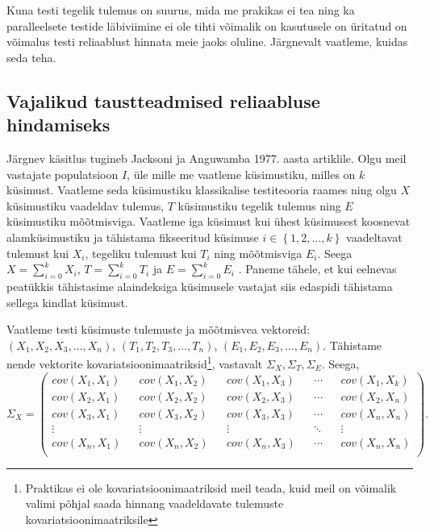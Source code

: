 \documentclass[a4paper,12pt,oneside]{article}
\numberwithin{equation}{section}
\theoremstyle{definition}
\begin{document}
Kuna testi tegelik tulemus on suurus, mida me prakikas ei tea ning ka paralleelsete testide läbiviimine ei ole tihti võimalik on kasutusele on üritatud on võimalus testi reliaablust hinnata meie jaoks oluline. Järgnevalt vaatleme, kuidas seda teha.



\subsection{Vajalikud taustteadmised reliaabluse hindamiseks}

Järgnev käsitlus tugineb Jacksoni ja Anguwamba 1977. aasta artiklile.\cite{Jackson1977}
Olgu meil vastajate populatsioon $I$, üle mille me vaatleme küsimustiku, milles on $k$ k\"usimust. Vaatleme seda küsimustiku klassikalise testiteooria raames ning olgu $X$ küsimustiku vaadeldav tulemus, $T$ küsimustiku tegelik tulemus ning $E$ küsimustiku mõõtmisviga. Vaatleme iga küsimust kui ühest küsimusest koosnevat alamküsimustiku ja tähistama fikseeritud k\"usimuse $ i \in \left\lbrace 1,2,\ldots,k \right\rbrace$ vaadeltavat tulemust kui $X_i$, tegeliku tulemust kui $T_i$ ning mõõtmisviga $E_i$. Seega $X = \sum \limits_{i=0}^{k} X_i$, $T = \sum \limits_{i=0}^{k} T_i$ ja $E = \sum \limits_{i=0}^{k} E_i$ . Paneme tähele, et kui eelnevas peatükkis tähistasime alaindeksiga küsimusele vastajat siis edaspidi tähistama sellega kindlat küsimust. 

Vaatleme testi k\"usimuste tulemuste ja mõõtmisvea vektoreid: $\left( X_1, X_2, X_3, \ldots, X_n \right)$, $\left( T_1, T_2, T_3, \ldots, T_n \right)$, $\left( E_1, E_2, E_3, \ldots, E_n \right)$. Tähistame nende vektorite kovariatsioonimaatriksid\footnote{Praktikas ei ole kovariatsioonimaatriksid meil teada, kuid meil on võimalik valimi põhjal saada hinnang vaadeldavate tulemuste kovariatsioonimaatriksile }, vastavalt $\Sigma_X, \Sigma_T, \Sigma_E$. Seega, 
\small
\begin{equation*}
\Sigma_X = 
\begin{pmatrix}
cov \left(X_1,X_1 \right) && cov\left( X_1,X_2 \right) && cov \left( X_1,X_3 \right) && \cdots && cov \left( X_1,X_k \right) \\
cov \left(X_2, X_1 \right) && cov \left(X_2, X_2 \right) && cov \left(X_2, X_3 \right) && \cdots && cov \left(X_2, X_n \right) \\
cov \left(X_3, X_1 \right) && cov \left(X_3, X_2 \right) && cov \left(X_3, X_3 \right) && \cdots && cov \left(X_n, X_n \right) \\
\vdots && \vdots && \vdots && \ddots && \vdots \\
cov \left(X_n, X_1 \right) && cov \left(X_n, X_2 \right) && cov \left(X_n, X_3 \right) && \cdots && cov \left(X_n, X_n \right) \\
\end{pmatrix}.
\end{equation*}
\normalsize
\end{document}
